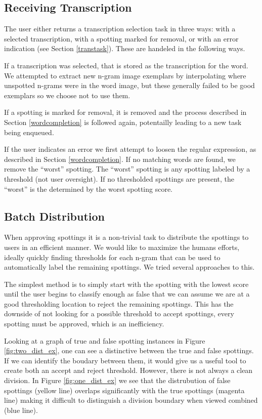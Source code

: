 \documentclass[ms,electronic,twosidetoc,letterpaper,chaptercenter,parttop,lof,lot]{byumsphd}
\begin{document}
\subsection{Receiving Transcription}
The user either returns a transcription selection task in three ways: with a selected transcription, with a spotting marked for removal, or with an error indication (see Section \ref{transtask}). These are handeled in the following ways.

If a transcription was selected, that is stored as the transcription for the word. We attempted to extract new n-gram image exemplars by interpolating where unspotted n-grams were in the word image, but these generally failed to be good exemplars so we choose not to use them.

If a spotting is marked for removal, it is removed and the process described in Section \ref{wordcompletion} is followed again, potentailly leading to a new task being enqueued.

If the user indicates an error we first attempt to loosen the regular expression, as described in Section \ref{wordcompletion}. If no matching words are found, we remove the ``worst'' spotting. The ``worst'' spotting is any spotting labeled by a threshold (not user oversight). If no thresholded spottings are present, the ``worst'' is the determined by the worst spotting score.


\subsection{Batch Distribution}
When approving spottings it is a non-trivial task to distribute the spottings to users in an efficient manner. We would like to maximize the humans efforts, ideally quickly finding thresholds for each n-gram that can be used to automatically label the remaining spottings. We tried several approaches to this.

The simplest method is to simply start with the spotting with the lowest score until the user begins to classify enough as false that  we can assume we are at a good thresholding location to reject the remaining spottings. 
This has the downside of not looking for a possible threshold to accept spottings, every spotting must be approved, which is an inefficiency.


Looking at a graph of true and false spotting instances in Figure \ref{fig:two_dist_ex}, one can see a distinctive between the true and false spottings. If we can identify the boudary between them, it would give us a useful tool to create both an accept and reject threshold. However, there is not always a clean division. In Figure \ref{fig:one_dist_ex} we see that the distrubution of false spottings (yellow line) overlaps significantly with the true spottings (magenta line) making it difficult to distinguish a division boundary when viewed combined (blue line).
\end{document}
